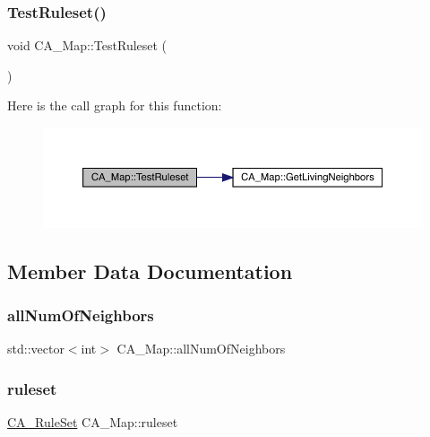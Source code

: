 \subsubsection{\texorpdfstring{Test\+Ruleset()}{TestRuleset()}}
{\footnotesize\ttfamily void C\+A\+\_\+\+Map\+::\+Test\+Ruleset (\begin{DoxyParamCaption}{ }\end{DoxyParamCaption})}

Here is the call graph for this function\+:
\nopagebreak
\begin{figure}[H]
\begin{center}
\leavevmode
\includegraphics[width=350pt]{df/dfe/class_c_a___map_a7a3a75540c418bdcee3689ecfca4cbff_cgraph}
\end{center}
\end{figure}


\subsection{Member Data Documentation}
\mbox{\label{class_c_a___map_a621e0347874d4f80984e7644059a542e}} 
\subsubsection{\texorpdfstring{all\+Num\+Of\+Neighbors}{allNumOfNeighbors}}
{\footnotesize\ttfamily std\+::vector$<$int$>$ C\+A\+\_\+\+Map\+::all\+Num\+Of\+Neighbors\hspace{0.3cm}{\ttfamily [private]}}

\mbox{\label{class_c_a___map_a7f21b6e31fec0a42ba6b47c93e7675fd}} 
\subsubsection{\texorpdfstring{ruleset}{ruleset}}
{\footnotesize\ttfamily \mbox{\hyperlink{_c_a_map_8hpp_a8502e9e74cc08ed2c245d58ff7cd4a88}{C\+A\+\_\+\+Rule\+Set}} C\+A\+\_\+\+Map\+::ruleset\hspace{0.3cm}{\ttfamily [private]}}



